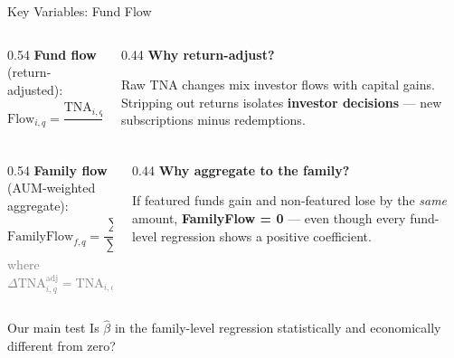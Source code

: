 \documentclass[11pt, aspectratio=169]{beamer}
\newcommand{\hl}[1]{\textcolor{myblue}{\textbf{#1}}}
\newcommand{\muted}[1]{\textcolor{gray}{#1}}
\begin{document}

\begin{frame}{Key Variables: Fund Flow}

\begin{columns}[T]
\begin{column}{0.54\textwidth}
\textbf{Fund flow} (return-adjusted):
\[
\text{Flow}_{i,q} = \frac{\text{TNA}_{i,q} - \text{TNA}_{i,q-1}(1+r_{i,q})}{\text{TNA}_{i,q-1}}
\]
\end{column}
\begin{column}{0.44\textwidth}
\textbf{Why return-adjust?}

\medskip
Raw TNA changes mix investor flows with capital gains.
Stripping out returns isolates \hl{investor decisions}
--- new subscriptions minus redemptions.
\end{column}
\end{columns}

\vspace{0.5cm}

\begin{columns}[T]
\begin{column}{0.54\textwidth}
\textbf{Family flow} (AUM-weighted aggregate):
\[
\text{FamilyFlow}_{f,q} = \frac{\displaystyle\sum_{i \in f}\!\Delta\text{TNA}_{i,q}^{\text{adj}}}{\displaystyle\sum_{i \in f} \text{TNA}_{i,q-1}}
\]
\vspace{0.1cm}
\muted{\small where $\Delta\text{TNA}_{i,q}^{\text{adj}} = \text{TNA}_{i,q} - \text{TNA}_{i,q-1}(1+r_{i,q})$}
\end{column}
\begin{column}{0.44\textwidth}
\textbf{Why aggregate to the family?}

\medskip
If featured funds gain and non-featured lose by the
\emph{same} amount, \hl{FamilyFlow = 0} --- even though
every fund-level regression shows a positive coefficient.
\end{column}
\end{columns}

\vspace{0.4cm}
\begin{block}{Our main test}
  Is $\widehat{\beta}$ in the family-level regression
  statistically and economically different from zero?
\end{block}

\end{frame}

\end{document}
